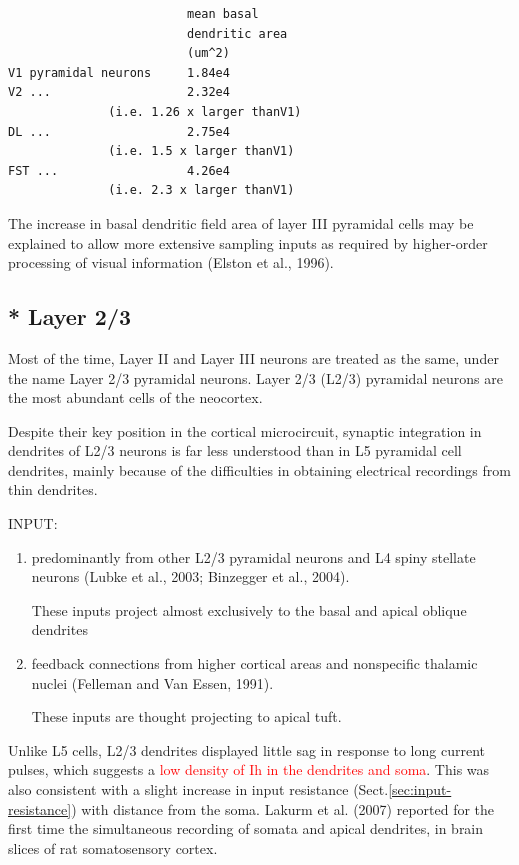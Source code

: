 \begin{verbatim}
                         mean basal            
                         dendritic area
                         (um^2)
V1 pyramidal neurons     1.84e4 
V2 ...                   2.32e4
              (i.e. 1.26 x larger thanV1)
DL ...                   2.75e4
              (i.e. 1.5 x larger thanV1)
FST ...                  4.26e4
              (i.e. 2.3 x larger thanV1)

\end{verbatim}
The increase in basal dendritic field area of layer III pyramidal cells may
be explained to allow more extensive sampling inputs as required by higher-order
processing of visual information (Elston et al., 1996).


\subsection{* Layer 2/3}
\label{sec:pyramidal-neuron-layer-2/3}

Most of the time, Layer II and Layer III neurons are treated as the same, under
the name Layer 2/3 pyramidal neurons. Layer 2/3 (L2/3) pyramidal neurons are the
most abundant cells of the neocortex.

Despite their key position in the cortical microcircuit, synaptic integration in
dendrites of L2/3 neurons is far less understood than in L5 pyramidal cell
dendrites, mainly because of the difficulties in obtaining electrical recordings
from thin dendrites.

INPUT:
\begin{enumerate}
  \item predominantly from other L2/3 pyramidal neurons and L4 spiny stellate
  neurons (Lubke et al., 2003; Binzegger et al., 2004).

These inputs project almost exclusively to the basal and apical oblique
dendrites

  \item feedback connections from higher cortical areas and nonspecific thalamic
  nuclei (Felleman and Van Essen, 1991).
  
These inputs are thought projecting to apical tuft.
\end{enumerate}

Unlike L5 cells, L2/3 dendrites displayed little sag in response to long current
pulses, which suggests a \textcolor{red}{low density of Ih in the dendrites and
soma}.  This was also consistent with a slight increase in input resistance
(Sect.\ref{sec:input-resistance}) with distance from the soma. Lakurm et al.
(2007) reported for the first time the simultaneous recording of somata and
apical dendrites, in brain slices of rat somatosensory cortex.

